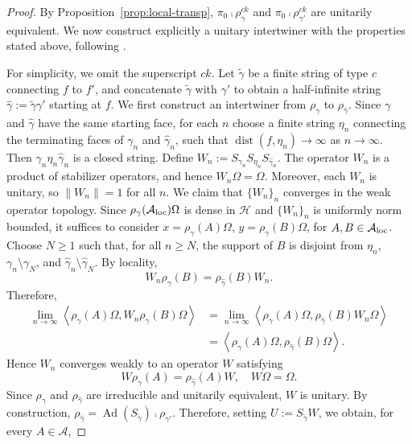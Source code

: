 \documentclass[a4paper,11pt]{article}
\theoremstyle{definition}
\theoremstyle{remark}
\theoremstyle{remark}
\begin{document}
\begin{proof}
    By Proposition~\ref{prop:local-transp}, $\pi_0\comp\rho_\gamma^{ck}$ and $\pi_0\comp\rho_{\gamma'}^{ck}$ are unitarily equivalent. We now construct explicitly a unitary intertwiner with the properties stated above, following \cite[Lemma~4.1]{naaijkens2011localized}.

    For simplicity, we omit the superscript $ck$. Let $\tilde{\gamma}$ be a finite string of type $c$ connecting $f$ to $f'$, and concatenate $\tilde{\gamma}$ with $\gamma'$ to obtain a half-infinite string $\widehat{\gamma}:=\tilde{\gamma}\gamma'$ starting at $f$. We first construct an intertwiner from $\rho_\gamma$ to $\rho_{\widehat{\gamma}}$. Since $\gamma$ and $\widehat{\gamma}$ have the same starting face, for each $n$ choose a finite string $\eta_n$ connecting the terminating faces of $\gamma_n$ and $\widehat{\gamma}_n$, such that $\operatorname{dist}(f,\eta_n)\to \infty$ as $n\to\infty$. Then $\gamma_n\eta_n\widehat{\gamma}_n$ is a closed string. Define $W_n := S_{\gamma_n} S_{\eta_n} S_{\widehat{\gamma}_n}$. 
    The operator $W_n$ is a product of stabilizer operators, and hence $W_n\Omega=\Omega$. Moreover, each $W_n$ is unitary, so $\|W_n\|=1$ for all $n$. We claim that $\{W_n\}_n$ converges in the weak operator topology. Since $\rho_\gamma(\mathcal A_{\rm loc})\Omega$ is dense in $\mathcal H$ and $\{W_n\}_n$ is uniformly norm bounded, it suffices to consider $x=\rho_\gamma(A)\Omega$, $y=\rho_\gamma(B)\Omega$, for $A,B\in\mathcal A_{\rm loc}$. Choose $N\geq1$ such that, for all $n\geq N$, the support of $B$ is disjoint from $\eta_n$, $\gamma_n\setminus\gamma_N$, and $\widehat{\gamma}_n\setminus\widehat{\gamma}_N$. By locality,
    \[
        W_n\rho_\gamma(B) = \rho_{\widehat{\gamma}}(B)W_n.
    \]
    Therefore,
    \begin{align*}
        \lim_{n\to\infty}\left\langle\rho_\gamma(A)\Omega,W_n\rho_\gamma(B)\Omega\right\rangle &= \lim_{n\to\infty}\left\langle\rho_\gamma(A)\Omega,\rho_{\widehat{\gamma}}(B)W_n\Omega\right\rangle
        \\
        &= \left\langle\rho_\gamma(A)\Omega,\rho_{\widehat{\gamma}}(B)\Omega\right\rangle .
    \end{align*}
    Hence $W_n$ converges weakly to an operator $W$ satisfying
    \[
        W\rho_\gamma(A) = \rho_{\widehat{\gamma}}(A)W, \quad W\Omega=\Omega.
    \]
    Since $\rho_\gamma$ and $\rho_{\widehat{\gamma}}$ are irreducible and unitarily equivalent, $W$ is unitary. By construction, $\rho_{\widehat{\gamma}} = \operatorname{Ad}(S_{\tilde{\gamma}}) \comp\rho_{\gamma'}$. Therefore, setting $U:=S_{\tilde{\gamma}}W$, we obtain, for every $A\in\mathcal A$,

\end{proof}
\end{document}
